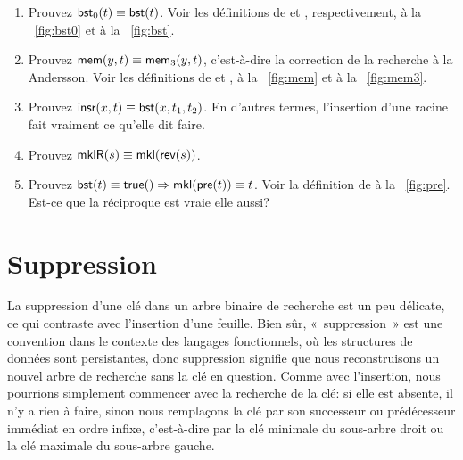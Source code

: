 \begin{enumerate}

  \item Prouvez \(\textsf{bst}_0(t) \equiv \textsf{bst}(t)\). Voir les
  définitions de  et
  , respectivement, à la
  \fig~\vref{fig:bst0} et à la \fig~\vref{fig:bst}.

  \item Prouvez \(\textsf{mem}(y,t) \equiv \textsf{mem}_3(y,t)\), c'est-à-dire
  la correction de la recherche à la Andersson. Voir les définitions
  de  et
  , à la
  \fig~\vref{fig:mem} et à la \fig~\vref{fig:mem3}.

  \item Prouvez \(\textsf{insr}(x,t) \equiv \textsf{bst}(x,t_1,t_2)\).
   En d'autres termes, l'insertion d'une
  racine fait vraiment ce qu'elle dit faire.

  \item Prouvez \(\textsf{mklR}(s) \equiv \textsf{mkl}(\textsf{rev}(s))\).
   

  \item Prouvez \(\textsf{bst}(t) \equiv \textsf{true}() \Rightarrow
  \textsf{mkl}(\textsf{pre}(t)) \equiv t\). Voir la définition de
    à la \fig~\vref{fig:pre}. Est-ce
  que la réciproque est vraie elle aussi?

\end{enumerate}

\section{Suppression}

La suppression d'une clé dans un arbre binaire de recherche est un peu
délicate, ce qui contraste avec l'insertion d'une feuille. Bien sûr,
«~suppression~» est une convention dans le contexte des langages
fonctionnels, où les structures de données sont persistantes, donc
suppression signifie que nous reconstruisons un nouvel arbre de
recherche sans la clé en question. Comme avec l'insertion, nous
pourrions simplement commencer avec la recherche de la clé: si elle
est absente, il n'y a rien à faire, sinon nous remplaçons la clé par
son successeur ou prédécesseur immédiat en ordre infixe, c'est-à-dire
par la clé minimale du sous-arbre droit ou la clé maximale du
sous-arbre gauche.

